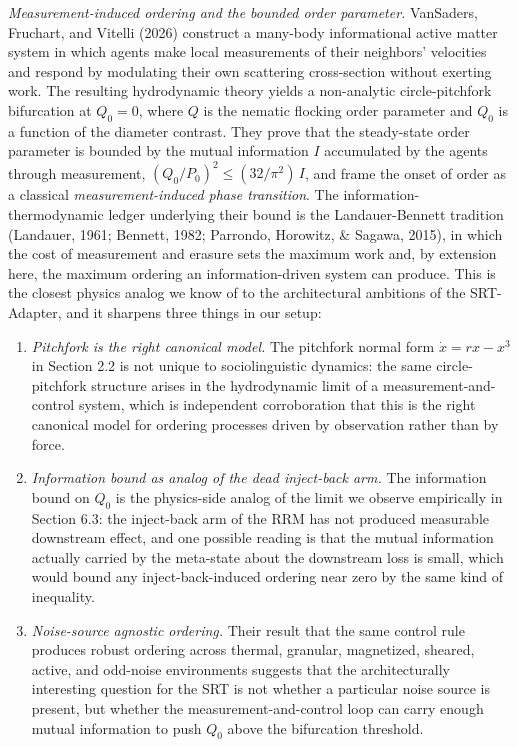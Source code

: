 \documentclass[
  11pt]{article}
\begin{document}
\emph{Measurement-induced ordering and the bounded order parameter.}
VanSaders, Fruchart, and Vitelli (2026) construct a many-body
informational active matter system in which agents make local
measurements of their neighbors' velocities and respond by modulating
their own scattering cross-section without exerting work. The resulting
hydrodynamic theory yields a non-analytic circle-pitchfork bifurcation
at \(Q_0 = 0\), where \(Q\) is the nematic flocking order parameter and
\(Q_0\) is a function of the diameter contrast. They prove that the
steady-state order parameter is bounded by the mutual information \(I\)
accumulated by the agents through measurement,
\((Q_0/P_0)^2 \le (32/\pi^2)\,I\), and frame the onset of order as a
classical \emph{measurement-induced phase transition}. The
information-thermodynamic ledger underlying their bound is the
Landauer-Bennett tradition (Landauer, 1961; Bennett, 1982; Parrondo,
Horowitz, \& Sagawa, 2015), in which the cost of measurement and erasure
sets the maximum work and, by extension here, the maximum ordering an
information-driven system can produce. This is the closest physics
analog we know of to the architectural ambitions of the SRT-Adapter, and
it sharpens three things in our setup:

\begin{enumerate}
\def\labelenumi{\arabic{enumi}.}
\item
  \emph{Pitchfork is the right canonical model.} The pitchfork normal
  form \(\dot{x} = rx - x^3\) in Section 2.2 is not unique to
  sociolinguistic dynamics: the same circle-pitchfork structure arises
  in the hydrodynamic limit of a measurement-and-control system, which
  is independent corroboration that this is the right canonical model
  for ordering processes driven by observation rather than by force.
\item
  \emph{Information bound as analog of the dead inject-back arm.} The
  information bound on \(Q_0\) is the physics-side analog of the limit
  we observe empirically in Section 6.3: the inject-back arm of the RRM
  has not produced measurable downstream effect, and one possible
  reading is that the mutual information actually carried by the
  meta-state about the downstream loss is small, which would bound any
  inject-back-induced ordering near zero by the same kind of inequality.
\item
  \emph{Noise-source agnostic ordering.} Their result that the same
  control rule produces robust ordering across thermal, granular,
  magnetized, sheared, active, and odd-noise environments suggests that
  the architecturally interesting question for the SRT is not whether a
  particular noise source is present, but whether the
  measurement-and-control loop can carry enough mutual information to
  push \(Q_0\) above the bifurcation threshold.
\end{enumerate}
\end{document}
